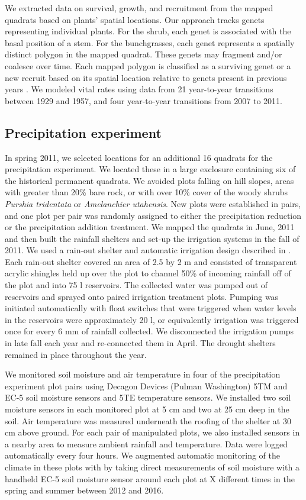 \documentclass[11pt]{article}
\begin{document}
\begin{doublespacing}
We extracted data on survival, growth, and recruitment from the mapped quadrats based on plants' spatial locations. Our approach tracks genets representing individual plants.  For the shrub, each genet is associated with the basal position of a stem.  For the bunchgrasses, each genet represents a spatially distinct polygon in the mapped quadrat. These genets may fragment and/or coalesce over time. Each mapped polygon is classified as a surviving genet or a new recruit based on its spatial location relative to genets present in previous years \citep{lauenroth_demography_2008}. We modeled vital rates using data from 21 year-to-year transitions between 1929 and 1957, and four year-to-year transitions from 2007 to 2011.  

\subsection*{Precipitation experiment}
In spring 2011, we selected locations for an additional 16 quadrats for the precipitation experiment. We located these in a large exclosure containing six of the historical permanent quadrats.  We avoided plots falling on hill slopes, areas with greater than 20\% bare rock, or with over 10\% cover of the woody shrubs \textit{Purshia tridentata} or \textit{Amelanchier utahensis}. New plots were established in pairs, and one plot per pair was randomly assigned to either the precipitation reduction or the precipitation addition treatment. We mapped the quadrats in June, 2011 and then built the rainfall shelters and set-up the irrigation systems in the fall of 2011. We used a rain-out shelter and automatic irrigation design described in \citep{gherardi, yahdjian_rainout_2002}. Each rain-out shelter covered an area of 2.5 by 2 m and consisted of transparent acrylic shingles held up over the plot to channel 50\% of incoming rainfall off of the plot and into 75 l reservoirs. The collected water was pumped out of reservoirs and sprayed onto paired irrigation treatment plots. Pumping was initiated automatically with float switches that were triggered when water levels in the reservoirs were approximately 20 l, or equivalently irrigation was triggered once for every 6 mm of rainfall collected. We disconnected the irrigation pumps in late fall each year and re-connected them in April.  The drought shelters remained in place throughout the year.  

We monitored soil moisture and air temperature in four of the precipitation experiment plot pairs using Decagon Devices (Pulman Washington) 5TM and EC-5 soil moisture sensors and 5TE temperature sensors.  We installed two soil moisture sensors in each monitored plot at 5 cm and two at 25 cm deep in the soil.  Air temperature was measured underneath the roofing of the shelter at 30 cm above ground. For each pair of manipulated plots, we also installed sensors in a nearby area to measure ambient rainfall and temperature. Data were logged automatically every four hours. We augmented automatic monitoring of the climate in these plots with by taking direct measurements of soil moisture with a handheld EC-5 soil moisture sensor around each plot at X different times in the spring and summer between 2012 and 2016.  



\end{doublespacing}
\end{document}
